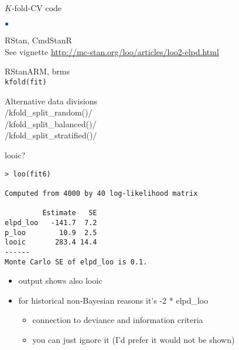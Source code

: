 \documentclass[english,t]{beamer}
\newenvironment{list1}{
   \begin{list}{$\color{list1}\bullet$}{\itemsep=6pt}}{
  \end{list}}
\begin{document}
\begin{frame}{}

  
\end{frame}

\begin{frame}{$K$-fold-CV code}

  \begin{list1}
  \item RStan, CmdStanR\\
    See vignette \url{http://mc-stan.org/loo/articles/loo2-elpd.html}
  \item RStanARM, brms\\
    \texttt{kfold(fit)}
  \item Alternative data divisions\\
  \rinline/kfold_split_random()/\\
  \rinline/kfold_split_balanced()/\\
  \rinline/kfold_split_stratified()/
  \end{list1}
  
\end{frame}


\begin{frame}[fragile]{looic?}

\begin{verbatim}
> loo(fit6)

Computed from 4000 by 40 log-likelihood matrix

         Estimate   SE
elpd_loo   -141.7  7.2
p_loo        10.9  2.5
looic       283.4 14.4
------
Monte Carlo SE of elpd_loo is 0.1.
\end{verbatim}

  \begin{itemize}
  \item {} output shows also {looic}
  \item for historical non-Bayesian reasons it's -2 * elpd\_loo
    \begin{itemize}
      \item connection to deviance and information criteria
      \item you can just ignore it (I'd prefer it would not be shown)
    \end{itemize}

  \end{itemize}
  
\end{frame}
\end{document}
